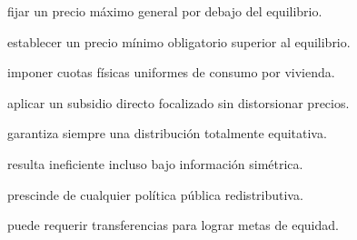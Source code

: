 \begin{opts}
    \item fijar un precio máximo general por debajo del equilibrio.
    \item establecer un precio mínimo obligatorio superior al equilibrio.
    \item imponer cuotas físicas uniformes de consumo por vivienda.
    \item aplicar un subsidio directo focalizado sin distorsionar precios.
\end{opts}

\begin{opts}
    \item garantiza siempre una distribución totalmente equitativa.
    \item resulta ineficiente incluso bajo información simétrica.
    \item prescinde de cualquier política pública redistributiva.
    \item puede requerir transferencias para lograr metas de equidad.
\end{opts}
